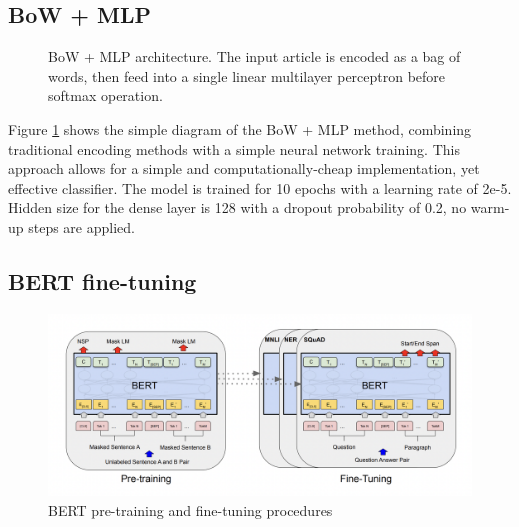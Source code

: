 \subsection{BoW + MLP}

\begin{figure}[htbp]
    \centering
    \caption{BoW + MLP architecture. The input article is encoded as a bag of words, then feed into a single linear multilayer perceptron before softmax operation.}
    \label{fig:bow_mlp_architecture}
\end{figure}

Figure \ref{fig:bow_mlp_architecture} shows the simple diagram of the BoW + MLP method, combining traditional encoding methods with a simple neural network training. This approach allows for a simple and computationally-cheap implementation, yet effective classifier. The model is trained for 10 epochs with a learning rate of 2e-5. Hidden size for the dense layer is 128 with a dropout probability of 0.2, no warm-up steps are applied.

\subsection{BERT fine-tuning}

\begin{figure}[htbp]
    \centering
    \includegraphics[width=0.9\linewidth]{images/bert_finetuning.png}
    \caption{BERT pre-training and fine-tuning procedures \cite{devlin-2019-bert}}
    \label{fig:bert_finetuning}
\end{figure}

